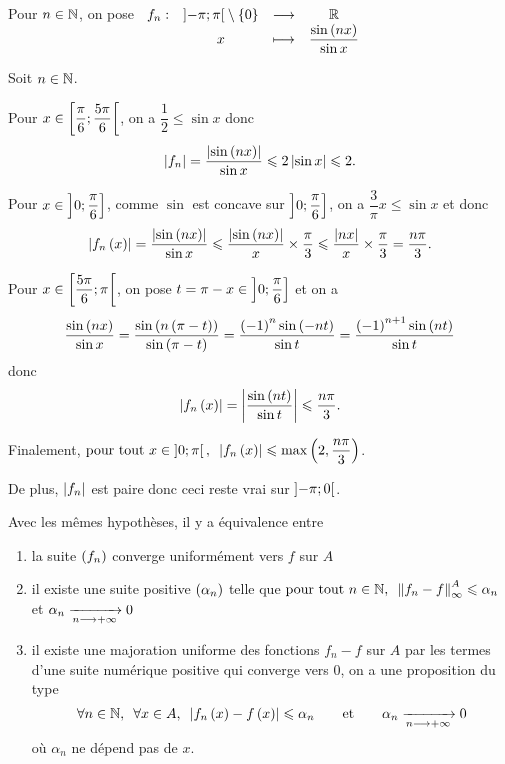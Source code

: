 \begin{corr}
Pour \(n\in\mathbb{N}\), on pose \(\begin{array}[t]{cccc}f_n : & \left]-\pi;\pi\right[\setminus\left\lbrace0\right\rbrace & \longrightarrow & \mathbb{R} \\ & x & \longmapsto & \dfrac{\sin\left(nx\right)}{\sin x}\end{array}\)

Soit \(n\in\mathbb{N}\).

Pour \(x\in\left[\dfrac{\pi}{6};\dfrac{5\pi}{6}\right[\), on a \(\dfrac{1}{2}\leq\sin x\) donc \[\left\lvert f_n\right\rvert=\dfrac{\left\lvert\sin\left(nx\right)\right\rvert}{\sin x}\leqslant2\left\lvert\sin x\right\rvert\leqslant2.\]

Pour \(x\in\left]0;\dfrac{\pi}{6}\right]\), comme \(\sin\) est concave sur \(\left]0;\dfrac{\pi}{6}\right]\), on a \(\dfrac{3}{\pi}x\leq\sin x\) et donc \[\left\lvert f_n\left(x\right)\right\rvert=\dfrac{\left\lvert\sin\left(nx\right)\right\rvert}{\sin x}\leqslant\dfrac{\left\lvert\sin\left(nx\right)\right\rvert}{x}\times\dfrac{\pi}{3}\leqslant\dfrac{\left\lvert nx\right\rvert}{x}\times\dfrac{\pi}{3}=\dfrac{n\pi}{3}.\]

Pour \(x\in\left[\dfrac{5\pi}{6};\pi\right[\), on pose \(t=\pi-x\in\left]0;\dfrac{\pi}{6}\right]\) et on a \[\dfrac{\sin\left(nx\right)}{\sin x}=\dfrac{\sin\left(n\left(\pi-t\right)\right)}{\sin\left(\pi-t\right)}=\dfrac{\left(-1\right)^n\sin\left(-nt\right)}{\sin t}=\dfrac{\left(-1\right)^{n+1}\sin\left(nt\right)}{\sin t}\] donc \[\left\lvert f_n\left(x\right)\right\rvert=\left\lvert\dfrac{\sin\left(nt\right)}{\sin t}\right\rvert\leqslant\dfrac{n\pi}{3}.\]

Finalement, \(\quantifs{\tpt x\in\intervee{0}{\pi}}\abs{f_n\paren{x}}\leq\max\paren{2,\dfrac{n\pi}{3}}\).

De plus, \(\left\lvert f_n\right\rvert\) est paire donc ceci reste vrai sur \(\left]-\pi;0\right[\).
\end{corr}

\begin{prop}
Avec les mêmes hypothèses, il y a équivalence entre

\begin{enumerate}
    \item la suite \(\left(f_n\right)\) converge uniformément vers \(f\) sur \(A\) \\
    \item il existe une suite positive \(\left(\alpha_n\right)\) telle que \(\quantifs{\tpt n\in\N}\norme{f_n-f}_\infty^A\leq\alpha_n\) et \(\alpha_n\xrightarrow[n\longrightarrow+\infty]{}0\) \\
    \item il existe une majoration uniforme des fonctions \(f_n-f\) sur \(A\) par les termes d'une suite numérique positive qui converge vers \(0\), \ie on a une proposition du type \[\quantifs{\forall n\in\N;\forall x\in A}\abs{f_n\paren{x}-f\paren{x}}\leq\alpha_n\qquad\text{et}\qquad\alpha_n\tendqd{n\to\pinf}0\] où \(\alpha_n\) ne dépend pas de \(x\).
\end{enumerate}
\end{prop}


